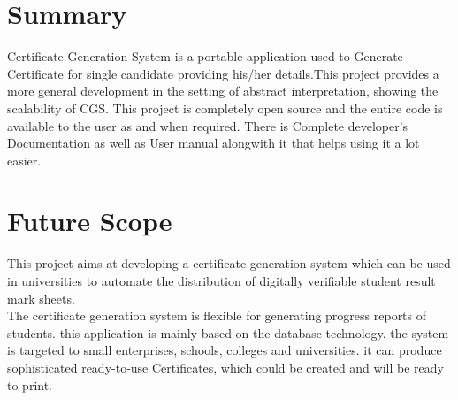 \section{Summary}
Certificate Generation System is a portable application used to Generate Certificate for single candidate providing his/her details.This project provides a more general development in the setting of abstract interpretation, showing the scalability of CGS. This project is completely open source and the entire code is available to the user as and when required. There is Complete developer’s Documentation as well as User manual alongwith it that helps using it a lot easier.

\section{Future Scope}
This project aims at developing a certificate generation system which can be used in universities to automate the distribution of digitally verifiable student result mark sheets.\\
The certificate generation system is flexible for generating progress reports of students. this application
is mainly based on the database technology. the system is targeted to small enterprises, schools, colleges
and universities. it can produce sophisticated ready-to-use Certificates, which could be created and will
be ready to print.


